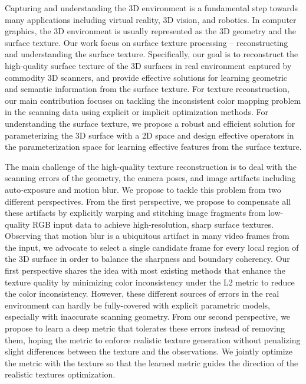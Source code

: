 Capturing and understanding the 3D environment is a fundamental step towards many applications including virtual reality, 3D vision, and robotics.
%
In computer graphics, the 3D environment is usually represented as the 3D geometry and the surface texture. Our work focus on surface texture processing -- reconstructing and understanding the surface texture.
%
Specifically, our goal is to reconstruct the high-quality surface texture of the 3D surfaces in real environment captured by commodity 3D scanners, and provide effective solutions for learning geometric and semantic information from the surface texture.
%
For texture reconstruction, our main contribution focuses on tackling the inconsistent color mapping problem in the scanning data using explicit or implicit optimization methods.
%
For understanding the surface texture, we propose a robust and efficient solution for parameterizing the 3D surface with a 2D space and design effective operators in the parameterization space for learning effective features from the surface texture.


The main challenge of the high-quality texture reconstruction is to deal with the scanning errors of the geometry, the camera poses, and image artifacts including auto-exposure and motion blur.
%
We propose to tackle this problem from two different perspectives.
%
From the first perspective, we propose to compensate all these artifacts by explicitly warping and stitching image fragments from low-quality RGB input data to achieve high-resolution, sharp surface textures.
%
Observing that motion blur is a ubiquitous artifact in many video frames from the input, we advocate to select a single candidate frame for every local region of the 3D surface in order to balance the sharpness and boundary coherency.
%
Our first perspective shares the idea with most existing methods that enhance the texture quality by minimizing color inconsistency under the L2 metric to reduce the color inconsistency.
%
However, these different sources of errors in the real environment can hardly be fully-covered with explicit parametric models, especially with inaccurate scanning geometry.
%
From our second perspective, we propose to learn a deep metric that tolerates these errors instead of removing them, hoping the metric to enforce realistic texture generation without penalizing slight differences between the texture and the observations. We jointly optimize the metric with the texture so that the learned metric guides the direction of the realistic textures optimization.


